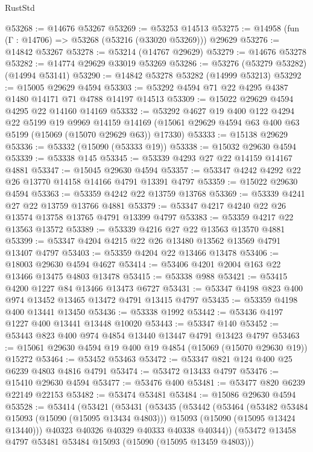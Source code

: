\begin{lexlean}{RustStd}
\begin{coremodule}
@53268 := @14676 @53267
@53269 := @53253 @14513
@53275 := @14958 (fun (Γ : @14706) => @53268 (@53216 (@33020 @53269))) @29629
@53276 := @14842 @53267
@53278 := @53214 (@14767 @29629)
@53279 := @14676 @53278
@53282 := @14774 @29629 @33019 @53269
@53286 := @53276 (@53279 @53282) (@14994 @53141)
@53290 := @14842 @53278 @53282 (@14999 @53213)
@53292 := @15005 @29629 @4594
@53303 := @53292 @4594 @71 @22 @4295 @4387 @1480 @14171 @71 @4788 @14197 @14513
@53309 := @15022 @29629 @4594 @4295 @22 @14160 @14169
@53332 := @53292
    @4627
    @19
    @400
    @122
    @4294
    @22
    @5199
    @19
    @9969
    @14159
    @14169
    (@15061 @29629 @4594 @63 @400 @63 @5199 (@15069 (@15070 @29629 @63)) @17330)
@53333 := @15138 @29629
@53336 := @53332 (@15090 (@53333 @19))
@53338 := @15032 @29630 @4594
@53339 := @53338 @145
@53345 := @53339 @4293 @27 @22 @14159 @14167 @4881
@53347 := @15045 @29630 @4594
@53357 := @53347 @4242 @4292 @22 @26 @13770 @14158 @14166 @4791 @13391 @4797
@53359 := @15022 @29630 @4594
@53363 := @53359 @4242 @22 @13759 @13768
@53369 := @53339 @4241 @27 @22 @13759 @13766 @4881
@53379 := @53347 @4217 @4240 @22 @26 @13574 @13758 @13765 @4791 @13399 @4797
@53383 := @53359 @4217 @22 @13563 @13572
@53389 := @53339 @4216 @27 @22 @13563 @13570 @4881
@53399 := @53347 @4204 @4215 @22 @26 @13480 @13562 @13569 @4791 @13407 @4797
@53403 := @53359 @4204 @22 @13466 @13478
@53406 := @18003 @29630 @4594 @4627
@53414 := @53406 @4201 @2004 @163 @22 @13466 @13475 @4803 @13478
@53415 := @53338 @988
@53421 := @53415 @4200 @1227 @84 @13466 @13473 @6727
@53431 := @53347 @4198 @823 @400 @974 @13452 @13465 @13472 @4791 @13415 @4797
@53435 := @53359 @4198 @400 @13441 @13450
@53436 := @53338 @1992
@53442 := @53436 @4197 @1227 @400 @13441 @13448 @10020
@53443 := @53347 @140
@53452 := @53443 @823 @400 @974 @4854 @13440 @13447 @4791 @13423 @4797
@53463 := @15061 @29630 @4594 @19 @400 @19 @4854 (@15069 (@15070 @29630 @19)) @15272
@53464 := @53452 @53463
@53472 := @53347 @821 @124 @400 @25 @6239 @4803 @4816 @4791
@53474 := @53472 @13433 @4797
@53476 := @15410 @29630 @4594
@53477 := @53476 @400
@53481 := @53477 @820 @6239 @22149 @22153
@53482 := @53474 @53481
@53484 := @15086 @29630 @4594
@53528 := @53414
    (@53421
      (@53431
        (@53435
          (@53442
            (@53464
              (@53482 @53484 @15093 (@15090 (@15095 @13434 @4803)))
              @15093
              (@15090 (@15095 @13424 @13440)))
            @40323
            @40326
            @40329
            @40333
            @40338
            @40344))
        (@53472 @13458 @4797 @53481 @53484 @15093 (@15090 (@15095 @13459 @4803)))

\end{coremodule}
\end{lexlean}
